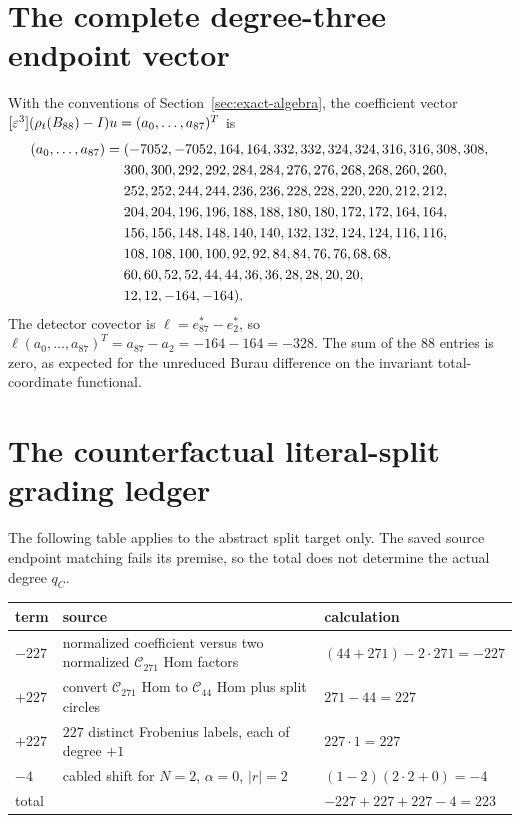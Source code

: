 \section{The complete degree-three endpoint vector}\label{app:vector}

With the conventions of Section~\ref{sec:exact-algebra}, the coefficient
vector $[\varepsilon^3](\rho_t(B_{88})-I)u=(a_0,\ldots,a_{87})^T$ is
\begin{align}
(a_0,\ldots,a_{87})={}&(
-7052,-7052,164,164,332,332,324,324,316,316,308,308,\notag\\
&300,300,292,292,284,284,276,276,268,268,260,260,\notag\\
&252,252,244,244,236,236,228,228,220,220,212,212,\notag\\
&204,204,196,196,188,188,180,180,172,172,164,164,\notag\\
&156,156,148,148,140,140,132,132,124,124,116,116,\notag\\
&108,108,100,100,92,92,84,84,76,76,68,68,\notag\\
&60,60,52,52,44,44,36,36,28,28,20,20,\notag\\
&12,12,-164,-164).
\end{align}
The detector covector is $\ell=e_{87}^*-e_2^*$, so
$\ell(a_0,\ldots,a_{87})^T=a_{87}-a_2=-164-164=-328$.
The sum of the $88$ entries is zero, as expected for the unreduced Burau
difference on the invariant total-coordinate functional.

\section{The counterfactual literal-split grading ledger}\label{app:grading}

The following table applies to the abstract split target only.  The saved
source endpoint matching fails its premise, so the total does not determine
the actual degree $q_C$.

\begin{center}
\begin{tabular}{@{}p{}p{}p{}@{}}
\toprule
term & source & calculation\\
\midrule
$-227$ & normalized coefficient versus two normalized $\mathcal C_{271}$ Hom factors & $(44+271)-2\cdot271=-227$\\
$+227$ & convert $\mathcal C_{271}$ Hom to $\mathcal C_{44}$ Hom plus split circles & $271-44=227$\\
$+227$ & $227$ distinct Frobenius labels, each of degree $+1$ & $227\cdot1=227$\\
$-4$ & cabled shift for $N=2$, $\alpha=0$, $|r|=2$ & $(1-2)(2\cdot2+0)=-4$\\
\midrule
total & & $-227+227+227-4=223$\\
\bottomrule
\end{tabular}
\end{center}

